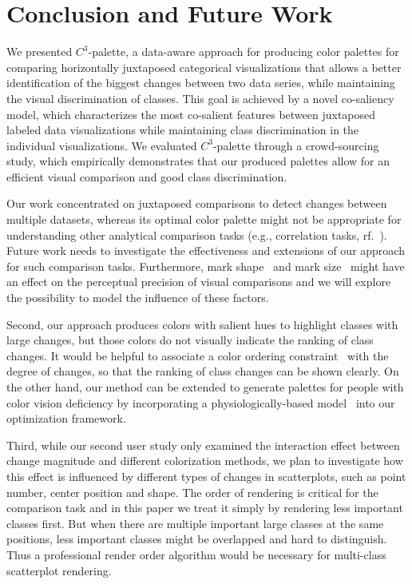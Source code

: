 \section {Conclusion and Future Work}
We presented $C^3$-palette, a data-aware approach for producing color
palettes for comparing horizontally juxtaposed categorical visualizations that allows a better identification of the biggest changes between two data series, while maintaining the visual discrimination of classes. This goal is
achieved by a  novel co-saliency model, which characterizes the most co-salient features between juxtaposed labeled data visualizations while maintaining class discrimination in the individual visualizations. We evaluated $C^3$-palette through a crowd-sourcing study, which empirically demonstrates that our produced
palettes allow for an efficient visual comparison and good class discrimination.

Our work concentrated on juxtaposed comparisons to detect changes between multiple datasets, whereas its optimal color palette might not be appropriate for understanding other analytical comparison tasks (e.g., correlation tasks, rf.~\cite{Ondov19}). Future work needs to investigate the effectiveness and extensions of our approach for such comparison tasks. Furthermore, mark shape~\cite{liu2021data} and mark size~\cite{smart2019measuring}  might have an effect on the perceptual precision of visual comparisons and we will explore the possibility to model the influence of these factors. %


Second, our approach produces colors with salient hues to highlight classes with large changes, but those colors do not visually indicate the ranking of class changes. It would be helpful to associate a color ordering constraint~\cite{Bujack18} with the degree of changes, so that the ranking of class changes can be shown clearly. On the other hand, our method can be extended to generate palettes for people with color vision deficiency by incorporating a physiologically-based model~\cite{machado2009physiologically} into our optimization framework.

Third, while our second user study only examined the interaction effect between change magnitude and different colorization methods, we plan to investigate how this effect is influenced by different types of changes in scatterplots, such as point number, center position and shape.
The order of rendering is critical for the comparison task and in this paper we treat it simply by rendering less important classes first. But when there are multiple important large classes at the same positions, less important classes might be overlapped and hard to distinguish. Thus a professional render order algorithm would be necessary for multi-class scatterplot rendering.

